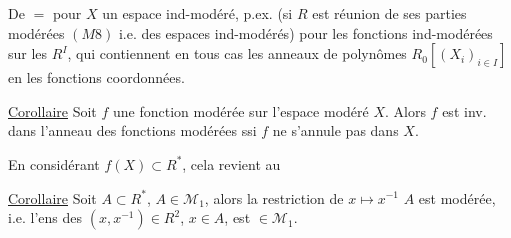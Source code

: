 De $=$ pour $X$ un espace ind-modéré, p.ex. (si $R$ est réunion  de ses parties modérées $(M8)$ i.e.   des espaces ind-modérés) pour les fonctions ind-modérées sur les $R^I$, qui contiennent en tous cas les  anneaux de polynômes $R_0[(X_i)_{i\in I}]$ en les fonctions coordonnées.


\uline{Corollaire} Soit $f$ une fonction modérée sur l'espace modéré $X$. Alors $f$ est inv. dans l'anneau des fonctions modérées ssi $f$ ne s'annule pas dans $X$.

En considérant $f(X)\subset R^*$, cela revient au

\uline{Corollaire} Soit $A\subset R^*$, $A\in\mathcal M_1$, alors la restriction de $x\mapsto x^{-1}$  $A$ est modérée, i.e. l'ens des $(x,x^{-1})\in R^2$, $x\in A$, est $\in\mathcal M_1$.
